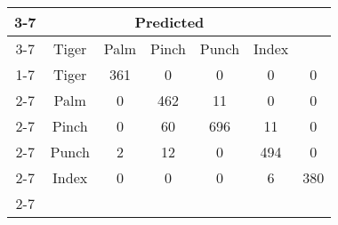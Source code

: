 \documentclass{standalone}
\begin{document}
 
 \begin{tabular}{|c |c |c |c |c |c |c |}
\cline{3-7}\multicolumn{2}{c|}{} & \multicolumn{5}{c|}{Predicted} \\ 
\cline{3-7} \multicolumn{2}{c |}{ } & Tiger & Palm & Pinch & Punch & Index\\ 
\cline{1-7}\multirow{5}{*}{\rotatebox[origin=c]{90}{Actual}} & Tiger & 361 & 0 & 0 & 0 & 0\\ 
 \cline{2-7} & Palm & 0 & 462 & 11 & 0 & 0\\ 
 \cline{2-7} & Pinch & 0 & 60 & 696 & 11 & 0\\ 
 \cline{2-7} & Punch & 2 & 12 & 0 & 494 & 0\\ 
 \cline{2-7} & Index & 0 & 0 & 0 & 6 & 380\\ 
 \cline{2-7}\hline \end{tabular}
 
\end{document}
